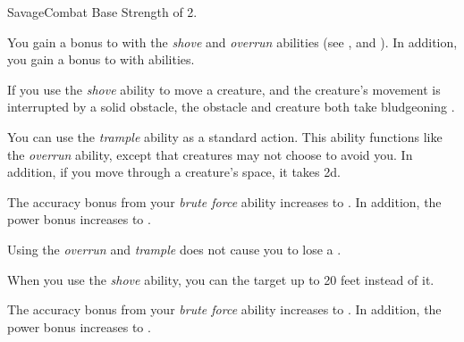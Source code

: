     \begin{feat}{Savage}{Combat}
        \featpre Base Strength of 2.

         You gain a  bonus to  with the \textit{shove} and \textit{overrun} abilities (see , and ).
        In addition, you gain a  bonus to  with  abilities.

         If you use the \textit{shove} ability to move a creature, and the creature's movement is interrupted by a solid obstacle, the obstacle and creature both take bludgeoning .

         You can use the \textit{trample} ability as a standard action.
        This ability functions like the \textit{overrun} ability, except that creatures may not choose to avoid you.
        In addition, if you move through a creature's space, it takes  \minus2d.

         The accuracy bonus from your \textit{brute force} ability increases to .
        In addition, the power bonus increases to .

         Using the \textit{overrun} and \textit{trample} does not cause you to lose a .

         When you use the \textit{shove} ability, you can  the target up to 20 feet instead of  it.

         The accuracy bonus from your \textit{brute force} ability increases to .
        In addition, the power bonus increases to .
    \end{feat}

